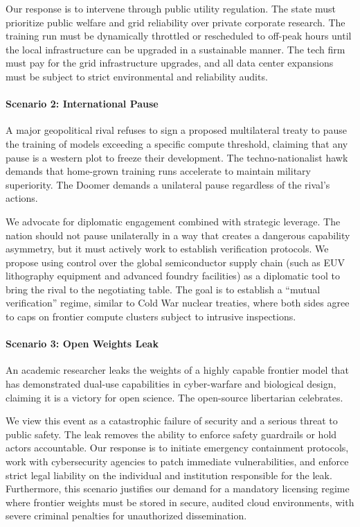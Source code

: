 Our response is to intervene through public utility regulation. The
state must prioritize public welfare and grid reliability over private
corporate research. The training run must be dynamically throttled or
rescheduled to off-peak hours until the local infrastructure can be
upgraded in a sustainable manner. The tech firm must pay for the grid
infrastructure upgrades, and all data center expansions must be subject
to strict environmental and reliability audits.

\paragraph{Scenario 2: International
Pause}\label{scenario-2-international-pause}

A major geopolitical rival refuses to sign a proposed multilateral
treaty to pause the training of models exceeding a specific compute
threshold, claiming that any pause is a western plot to freeze their
development. The techno-nationalist hawk demands that home-grown
training runs accelerate to maintain military superiority. The Doomer
demands a unilateral pause regardless of the rival's actions.

We advocate for diplomatic engagement combined with strategic leverage.
The nation should not pause unilaterally in a way that creates a
dangerous capability asymmetry, but it must actively work to establish
verification protocols. We propose using control over the global
semiconductor supply chain (such as EUV lithography equipment and
advanced foundry facilities) as a diplomatic tool to bring the rival to
the negotiating table. The goal is to establish a ``mutual
verification'' regime, similar to Cold War nuclear treaties, where both
sides agree to caps on frontier compute clusters subject to intrusive
inspections.

\paragraph{Scenario 3: Open Weights
Leak}\label{scenario-3-open-weights-leak}

An academic researcher leaks the weights of a highly capable frontier
model that has demonstrated dual-use capabilities in cyber-warfare and
biological design, claiming it is a victory for open science. The
open-source libertarian celebrates.

We view this event as a catastrophic failure of security and a serious
threat to public safety. The leak removes the ability to enforce safety
guardrails or hold actors accountable. Our response is to initiate
emergency containment protocols, work with cybersecurity agencies to
patch immediate vulnerabilities, and enforce strict legal liability on
the individual and institution responsible for the leak. Furthermore,
this scenario justifies our demand for a mandatory licensing regime
where frontier weights must be stored in secure, audited cloud
environments, with severe criminal penalties for unauthorized
dissemination.


